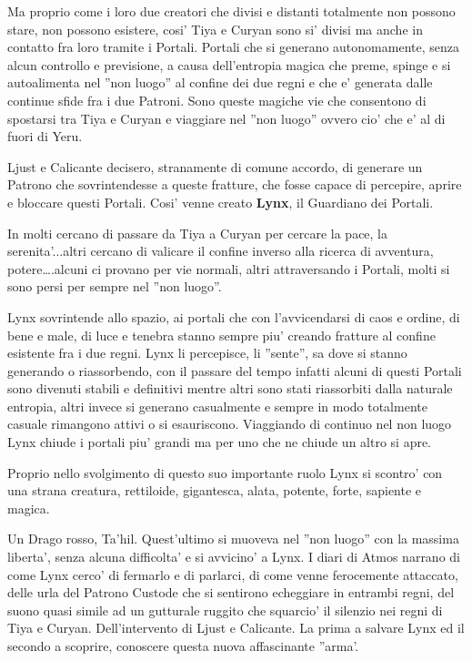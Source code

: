 \documentclass[a4paper,11pt,twoside,openany]{book}
\begin{document}
{Ma proprio come i loro due creatori che divisi e distanti totalmente non possono stare, non possono esistere, cosi' Tiya e Curyan sono si' divisi ma anche in contatto fra loro tramite i Portali. Portali che si generano autonomamente, senza alcun controllo e previsione, a causa dell'entropia magica che preme, spinge e si autoalimenta nel ''non luogo'' al confine dei due regni e che e' generata dalle continue sfide fra i due Patroni. Sono queste magiche vie che consentono di spostarsi tra Tiya e Curyan e viaggiare nel ''non luogo'' ovvero cio' che e' al di fuori di Yeru.

Ljust e Calicante decisero, stranamente di comune accordo, di generare un Patrono che sovrintendesse a queste fratture, che fosse capace di percepire, aprire e bloccare questi Portali. Cosi' venne creato \textbf{Lynx}, il Guardiano dei Portali.

In molti cercano di passare da Tiya a Curyan per cercare la pace, la serenita'...altri cercano di valicare il confine inverso alla ricerca di avventura, potere\ldots .alcuni ci provano per vie normali, altri attraversando i Portali, molti si sono persi per sempre nel ''non luogo''.

Lynx sovrintende allo spazio, ai portali che con l'avvicendarsi di caos e ordine, di bene e male, di luce e tenebra stanno sempre piu' creando fratture al confine esistente fra i due regni. Lynx li percepisce, li ''sente'', sa dove si stanno generando o riassorbendo, con il passare del tempo infatti alcuni di questi Portali sono divenuti stabili e definitivi mentre altri sono stati riassorbiti dalla naturale entropia, altri invece si generano casualmente e sempre in modo totalmente casuale rimangono attivi o si esauriscono. Viaggiando di continuo nel non luogo Lynx chiude i portali piu' grandi ma per uno che ne chiude un altro si apre.

Proprio nello svolgimento di questo suo importante ruolo Lynx si scontro' con una strana creatura, rettiloide, gigantesca, alata, potente, forte, sapiente e magica.

Un Drago rosso, Ta'hil. Quest'ultimo si muoveva nel ''non luogo'' con la massima liberta', senza alcuna difficolta' e si avvicino' a Lynx. I diari di Atmos narrano di come Lynx cerco' di fermarlo e di parlarci, di come venne ferocemente attaccato, delle urla del Patrono Custode che si sentirono echeggiare in entrambi regni, del suono quasi simile ad un gutturale ruggito che squarcio' il silenzio nei regni di Tiya e Curyan. Dell'intervento di Ljust e Calicante. La prima a salvare Lynx ed il secondo a scoprire, conoscere questa nuova affascinante ''arma'.

}
\end{document}
